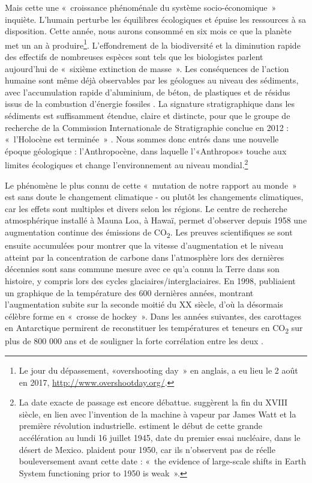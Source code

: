 Mais cette une «~croissance phénoménale du système socio-économique~» \citep{Steffen2004} inquiète. L’humain perturbe les équilibres écologiques et épuise les ressources à sa disposition. Cette année, nous aurons consommé en six mois ce que la planète met un an à produire\footnote{Le jour du dépassement,  «overshooting day~» en anglais, a eu lieu le 2 août en 2017, \url{http://www.overshootday.org/}.}. L’effondrement de la biodiversité et la diminution rapide des effectifs de nombreuses espèces sont tels que les biologistes parlent aujourd’hui de «~sixième extinction de masse~». Les conséquences de l'action humaine sont même déjà observables par les géologues au niveau des sédiments, avec l'accumulation rapide d'aluminium, de béton, de plastiques et de résidus issus de la combustion d'énergie fossiles \citep{Waters2016}. La signature stratigraphique dans les sédiments est suffisamment étendue, claire et distincte, pour que le groupe de recherche de la Commission Internationale de Stratigraphie conclue en 2012 : «~l'Holocène est terminée~» \citep{Latour2014}. Nous sommes donc entrés dans une nouvelle époque géologique : l'Anthropocène, dans laquelle l'«Anthropos» touche aux limites écologiques et change l'environnement au niveau mondial.\footnote{La date exacte de passage est encore débattue. \citet{Crutzen2000} suggèrent la fin du XVIII siècle, en lien avec l'invention de la machine à vapeur par James Watt et la première révolution industrielle. \citet{Zalasiewicz2014} estiment le début de cette grande accélération au lundi 16 juillet 1945, date du premier essai nucléaire, dans le désert de Mexico. \citet{Steffen2015}  plaident pour 1950, car ils n'observent pas de réelle bouleversement avant cette date : «~the evidence of large-scale shifts in Earth System functioning prior to 1950 is weak~».}

Le phénomène le plus connu de cette «~mutation de notre rapport au monde~» \citep{Latour2015} est sans doute le changement climatique  - ou plutôt les changements climatiques, car les effets sont multiples et divers selon les régions.
Le centre de recherche atmosphérique installé à Mauna Loa, à Hawaï, permet d'observer depuis 1958 une augmentation continue des émissions de CO\textsubscript{2}. Les preuves scientifiques se sont ensuite accumulées pour montrer que la vitesse d'augmentation et le niveau atteint par la concentration de carbone dans l'atmosphère lors des dernières décennies sont sans commune mesure avec ce qu'a connu la Terre dans son histoire, y compris lors des cycles glaciaires/interglaciaires. En 1998, \citet{Mann1998} publiaient un graphique de la température des 600 dernières années, montrant l'augmentation subite sur la seconde moitié du XX siècle, d'où la désormais célèbre forme en «~crosse de hockey~». 
Dans les années suivantes, des carottages en Antarctique permirent de reconstituer les températures et teneurs en CO\textsubscript{2} sur plus de 800 000 ans et de souligner la forte corrélation entre les deux \citep{Petit1999,Luthi2008}.

